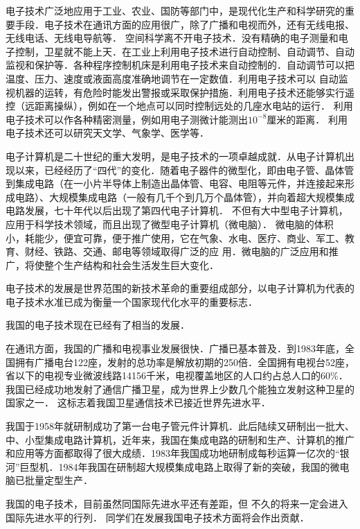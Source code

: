 电子技术广泛地应用于工业、农业、国防等部门中，是现代化生产和科学研究的重要手段．电子技术在通讯方面的应用很广，除了广播和电视而外，还有无线电报、无线电话、无线电导航等．
空间科学离不开电子技术．没有精确的电子测量和电子控制，卫星就不能上天．在工业上利用电子技术进行自动控制、自动调节、自动监视和保护等．各种程序控制机床是利用电子技术来自动控制的．自动调节可以把温度、压力、速度或液面高度准确地调节在一定数值．利用电子技术可以
自动监视机器的运转，有危险时能发出警报或采取保护措施．利用电子技术还能够实行遥控（远距离操纵），例如在一个地点可以同时控制远处的几座水电站的运行．
利用电子技术可以作各种精密测量，例如用电子测微计能测出$10^{-8}$厘米的距离．
利用电子技术还可以研究天文学、气象学、医学等．

电子计算机是二十世纪的重大发明，是电子技术的一项卓越成就．从电子计算机出现以来，已经经历了“四代”的变化．随着电子器件的微型化，即由电子管、晶体管到集成电路（在一小片半导体上制造出晶体管、电容、电阻等元件，并连接起来形成电路）、大规模集成电路（一般有几千个到几万个晶体管），并向着超大规模集成电路发展，七十年代以后出现了第四代电子计算机．
不但有大中型电子计算机，应用于科学技术领域，而且出现了微型电子计算机（微电脑）．
微电脑的体积
小，耗能少，便宜可靠，便于推广使用，它在气象、水电、医疗、商业、军工、教育、财经、铁路、交通、邮电等领域取得广泛的应
用．微电脑的广泛应用和推广，将使整个生产结构和社会生活发生巨大变化．

电子技术的发展是世界范围的新技术革命的重要组成部分，以电子计算机为代表的电子技术水准已成为衡量一个国家现代化水平的重要标志．

我国的电子技术现在已经有了相当的发展．

在通讯方面，我国的广播和电视事业发展很快．广播已基本普及．到1983年底，全国拥有广播电台122座，发射的总功率是解放初期的250倍．全国拥有电视台52座，省以下的电视专业微波线路14156千米，电视覆盖地区的人口约占总人口的60\%．
我国已经成功地发射了通信广播卫星，成为世界上少数几个能独立发射这种卫星的国家之一．
这标志着我国卫星通信技术已接近世界先进水平．

我国于1958年就研制成功了第一台电子管元件计算机．此后陆续又研制出一批大、中、小型集成电路计算机，近年来，我国在集成电路的研制和生产、计算机的推广和应用等方面都取得了很大成绩．1983年我国成功地研制成每秒运算一亿次的“银河”巨型机．1984年我国在研制超大规模集成电路上取得了新的突破，我国的微电脑已批量定型生产．

我国的电子技术，目前虽然同国际先进水平还有差距，但
不久的将来一定会进入国际先进水平的行列．
同学们在发展我国电子技术方面将会作出贡献．

